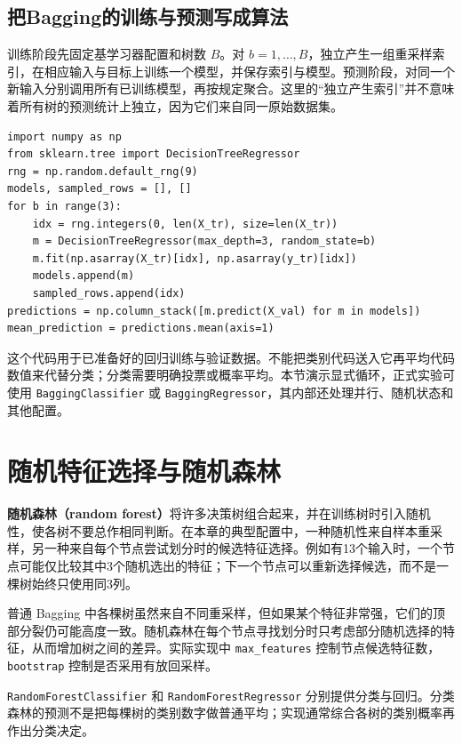 \subsection{把Bagging的训练与预测写成算法}
训练阶段先固定基学习器配置和树数 $B$。对 $b=1,\ldots,B$，独立产生一组重采样索引，在相应输入与目标上训练一个模型，并保存索引与模型。预测阶段，对同一个新输入分别调用所有已训练模型，再按规定聚合。这里的“独立产生索引”并不意味着所有树的预测统计上独立，因为它们来自同一原始数据集。

\begin{lstlisting}[caption={显式展示三棵自助树，便于核对重采样与预测}]
import numpy as np
from sklearn.tree import DecisionTreeRegressor
rng = np.random.default_rng(9)
models, sampled_rows = [], []
for b in range(3):
    idx = rng.integers(0, len(X_tr), size=len(X_tr))
    m = DecisionTreeRegressor(max_depth=3, random_state=b)
    m.fit(np.asarray(X_tr)[idx], np.asarray(y_tr)[idx])
    models.append(m)
    sampled_rows.append(idx)
predictions = np.column_stack([m.predict(X_val) for m in models])
mean_prediction = predictions.mean(axis=1)
\end{lstlisting}

这个代码用于已准备好的回归训练与验证数据。不能把类别代码送入它再平均代码数值来代替分类；分类需要明确投票或概率平均。本节演示显式循环，正式实验可使用 \texttt{BaggingClassifier} 或 \texttt{BaggingRegressor}，其内部还处理并行、随机状态和其他配置。

\section{随机特征选择与随机森林}

\textbf{随机森林（random forest）}将许多决策树组合起来，并在训练树时引入随机性，使各树不要总作相同判断。在本章的典型配置中，一种随机性来自样本重采样，另一种来自每个节点尝试划分时的候选特征选择。例如有13个输入时，一个节点可能仅比较其中3个随机选出的特征；下一个节点可以重新选择候选，而不是一棵树始终只使用同3列。

普通 Bagging 中各棵树虽然来自不同重采样，但如果某个特征非常强，它们的顶部分裂仍可能高度一致。随机森林在每个节点寻找划分时只考虑部分随机选择的特征，从而增加树之间的差异。实际实现中 \texttt{max\_features} 控制节点候选特征数，\texttt{bootstrap} 控制是否采用有放回采样。

\texttt{RandomForestClassifier} 和 \texttt{RandomForestRegressor} 分别提供分类与回归。分类森林的预测不是把每棵树的类别数字做普通平均；实现通常综合各树的类别概率再作出分类决定。

